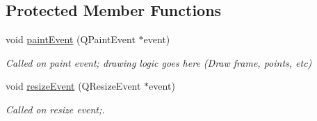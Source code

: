 \subsection*{Protected Member Functions}
\begin{DoxyCompactItemize}
\item 
void \hyperlink{classTrackVideoWidget_adb4de30d1e73669059561a5362da1a1b}{paint\+Event} (Q\+Paint\+Event $\ast$event)\hypertarget{classTrackVideoWidget_adb4de30d1e73669059561a5362da1a1b}{}\label{classTrackVideoWidget_adb4de30d1e73669059561a5362da1a1b}

\begin{DoxyCompactList}\small\item\em Called on paint event; drawing logic goes here (Draw frame, points, etc) \end{DoxyCompactList}\item 
void \hyperlink{classTrackVideoWidget_a5dba5d4a6290b6385920d977c93ddd6a}{resize\+Event} (Q\+Resize\+Event $\ast$event)\hypertarget{classTrackVideoWidget_a5dba5d4a6290b6385920d977c93ddd6a}{}\label{classTrackVideoWidget_a5dba5d4a6290b6385920d977c93ddd6a}

\begin{DoxyCompactList}\small\item\em Called on resize event;. \end{DoxyCompactList}\end{DoxyCompactItemize}
